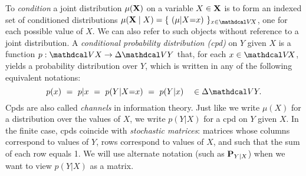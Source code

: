 To \emph{condition} a joint distribution $\mu(\mathbf X)$ on a variable $X \in \mathbf X$ is to form an indexed set of conditioned distributions $\mu(\mat X \mid X) = \{ ~(\mu|X{=}x) ~\}_{x \in \V\!X}$, one for each possible value of $X$. 
We can also refer to such objects without reference to a joint distribution.
%
%
A \emph{conditional probability distribution (cpd)} on $Y$ given $X$ is a function $p : \V X \to \Delta \V Y$ that, for each $x \in \V\!X$, yields a probability distribution over $Y$,
which is written in any of the following equivalent notations:
\[ 
p(x) ~=~ p|x ~=~ p(Y | X{=}x) ~=~ p(Y | x) \quad \in \Delta \V Y.
\]
Cpds are also called \emph{channels} in information theory. 
Just like we write $\mu(X)$ for a distribution over the values of $X$, we
write $p(Y|X)$ for a cpd on $Y$ given $X$. 
In the finite case, cpds coincide with \emph{stochastic matrices}: matrices whose columns correspond to values of $Y$, rows correspond to values of $X$, and such that the sum of each row equals 1. 
We will use alternate notation (such as $\mathbf P_{Y|X}$) when we want to view $p(Y|X)$ as a matrix.

